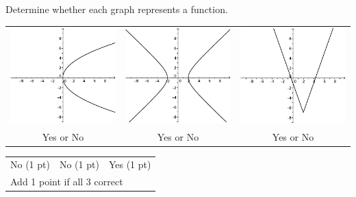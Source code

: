 {
	Determine whether each graph represents a function.
	\begin{center}
	\begin{tabular}{ccc}
	\includegraphics[scale=1]{fig100-22-a-i.pdf} & \includegraphics[scale=1]{fig100-22-a-ii.pdf} & \includegraphics[scale=1]{fig100-22-a-iii.pdf}\\
	Yes or No & Yes or No & Yes or No
	\end{tabular}
	\end{center}
}
{
	\begin{tabular}{lll}
	No (1 pt) & No (1 pt) & Yes (1 pt)\\
	\multicolumn{3}{l}{Add 1 point if all 3 correct}
	\end{tabular}
}

